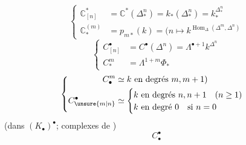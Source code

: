 

\[
\left\{\begin{aligned}
\mathbb C_{[n]}^*&=\mathbb C^*(\Delta_*^n)=k_*(\Delta_*^n)=k_*^{\Delta_*^n}\\
\mathbb C_*^{(m)}&=p_{m*}(k)=(n\longmapsto k^{\operatorname{Hom}_\Delta(\Delta^m,\Delta^n)}
\end{aligned}\right.
\]
\[
\left\{\begin{aligned}
C_{[n]}^\bullet&=C^\bullet(\Delta^n)=\Lambda^{\bullet+1}k^{\Delta^n}\\
C_*^m&=\Lambda^{1+m}\Phi_*
\end{aligned}\right.
\]
\[
\left\{\begin{aligned}
C_\bullet^m&\simeq k\ \text{en degrés }m,m+1)\\
C_{\unsure{m|n}}^\bullet&\simeq
\begin{cases}k\ \text{en degrés }n,n+1\quad(n\geq1)\\
k\ \text{en degré }0\quad\text{si }n=0
\end{cases}
\end{aligned}\right.
\]
(dans $(K_\bullet)^\bullet$; complexes de )
\[
C_\bullet^\bullet
\]


